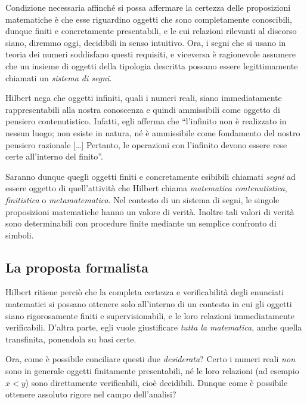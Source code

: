 Condizione necessaria affinché si possa affermare la certezza delle proposizioni matematiche è che esse riguardino oggetti che sono completamente conoscibili, dunque finiti e concretamente presentabili, e le cui relazioni rilevanti al discorso siano, diremmo oggi, decidibili in senso intuitivo. Ora, i segni che si usano in teoria dei numeri soddisfano questi requisiti, e viceversa è ra\-gio\-ne\-vo\-le assumere che un insieme di oggetti della tipologia descritta possano essere legittimamente chiamati un \emph{sistema di segni}.

Hilbert nega che oggetti infiniti, quali i numeri reali, siano immediatamente rappresentabili alla nostra conoscenza e quindi ammissibili come oggetto di pensiero contenutistico. Infatti, egli afferma che ``l'infinito non è rea\-liz\-za\-to in nessun luogo; non esiste in natura, né è ammissibile come fondamento del nostro pensiero razionale [\dots] Pertanto, le operazioni con l'infinito devono essere rese certe all'interno del finito''.

Saranno dunque quegli oggetti finiti e concretamente esibibili chiamati \emph{segni} ad essere oggetto di quell'attività che Hilbert chiama \emph{matematica contenutistica}, \emph{finitistica} o \emph{metamatematica}. Nel contesto di un sistema di segni, le singole proposizioni matematiche hanno un valore di verità.
Inoltre tali valori di ve\-ri\-tà sono determinabili con procedure finite mediante un semplice confronto di simboli.
\bigskip

\subsection{La proposta formalista}

Hilbert ritiene perciò che la completa certezza e verificabilità degli enunciati matematici si possano ottenere solo all'interno di un contesto in cui gli oggetti siano rigorosamente finiti e supervisionabili, e le loro relazioni immediatamente verificabili. D'altra parte, egli vuole giustificare \emph{tutta la matematica}, anche quella transfinita, ponendola su basi certe.

Ora, come è possibile conciliare questi due \emph{desiderata}? Certo i numeri reali \emph{non} sono in generale oggetti finitamente presentabili, né le loro relazioni (ad esempio $x<y$) sono direttamente verificabili, cioè decidibili. Dunque come è possibile ottenere assoluto rigore nel campo dell'analisi?

